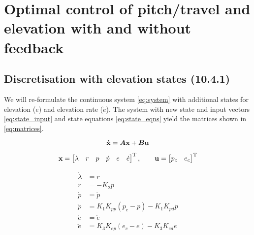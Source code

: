 \section{Optimal control of pitch/travel and elevation with and without feedback}

\subsection{Discretisation with elevation states (10.4.1)}
We will re-formulate the continuous system \eqref{eq:system} with additional states for elevation ($e$) and elevation rate ($\dot{e}$). The system with new state and input vectors \eqref{eq:state_input} and state equations \eqref{eq:state_eqns} yield the matrices shown in \eqref{eq:matrices}.

\begin{equation}\label{eq:system}
	\mathbf{\dot{x}}	= \bm{A} \mathbf{x} + \bm{B} \mathbf{u}
\end{equation}

\begin{equation}\label{eq:state_input}
	\mathbf{x} =
	\begin{bmatrix}
		\lambda & r & p & \dot{p} & e & \dot{e}
	\end{bmatrix}^{\text{T}}
	,\qquad
	\mathbf{u} =
	\begin{bmatrix}
		p_{c} & e_{c}
	\end{bmatrix}^{\text{T}}
\end{equation}

\begin{subequations}\label{eq:state_eqns}
\begin{align}
	\dot{\lambda}	&= r \\
	\dot{r} 		&= - K_{2} p \\
	\dot{p}			&= \dot{p} \\
	\ddot{p}		&= K_{1} K_{pp} (p_{c} - p) - K_{1} K_{pd} \dot{p} \\
	\dot{e}			&= \dot{e} \\
	\ddot{e}		&= K_{3} K_{ep} (e_{c} - e) - K_{3} K_{ed} \dot{e}
\end{align}
\end{subequations}

